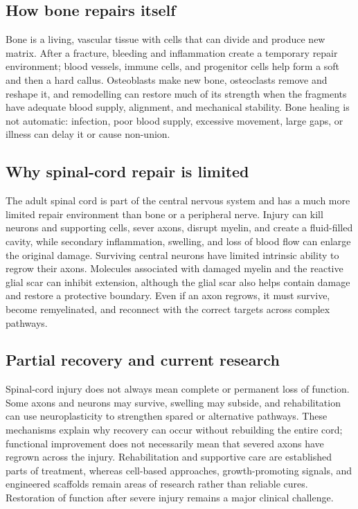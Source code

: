 \documentclass[11pt,oneside]{report}
\begin{document}
\subsection*{How bone repairs itself}

Bone is a living, vascular tissue with cells that can divide and produce new
matrix. After a fracture, bleeding and inflammation create a temporary repair
environment; blood vessels, immune cells, and progenitor cells help form a soft
and then a hard callus. Osteoblasts make new bone, osteoclasts remove and
reshape it, and remodelling can restore much of its strength when the fragments
have adequate blood supply, alignment, and mechanical stability. Bone healing
is not automatic: infection, poor blood supply, excessive movement, large gaps,
or illness can delay it or cause non-union.

\subsection*{Why spinal-cord repair is limited}

The adult spinal cord is part of the central nervous system and has a much more
limited repair environment than bone or a peripheral nerve. Injury can kill
neurons and supporting cells, sever axons, disrupt myelin, and create a
fluid-filled cavity, while secondary inflammation, swelling, and loss of blood
flow can enlarge the original damage. Surviving central neurons have limited
intrinsic ability to regrow their axons. Molecules associated with damaged
myelin and the reactive glial scar can inhibit extension, although the glial
scar also helps contain damage and restore a protective boundary. Even if an
axon regrows, it must survive, become remyelinated, and reconnect with the
correct targets across complex pathways.

\subsection*{Partial recovery and current research}

Spinal-cord injury does not always mean complete or permanent loss of function.
Some axons and neurons may survive, swelling may subside, and rehabilitation
can use neuroplasticity to strengthen spared or alternative pathways. These
mechanisms explain why recovery can occur without rebuilding the entire cord;
functional improvement does not necessarily mean that severed axons have
regrown across the injury.
Rehabilitation and supportive care are established parts of treatment, whereas
cell-based approaches, growth-promoting signals, and engineered scaffolds
remain areas of research rather than reliable cures. Restoration of function
after severe injury remains a major clinical challenge.
\end{document}
